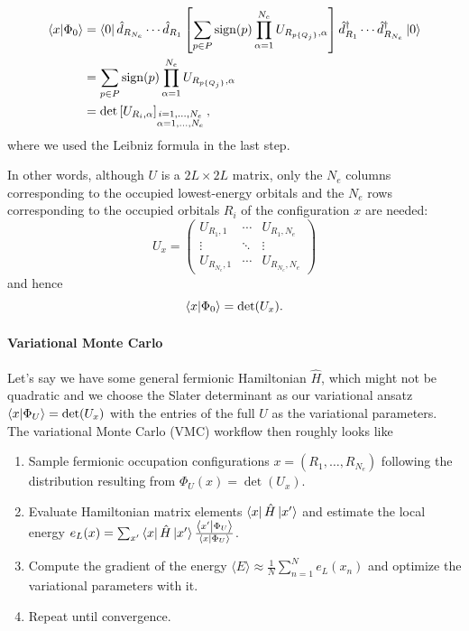 \documentclass[../../../main.tex]{subfiles}
\begin{document}
\begin{align}
    \left\langle x \middle| \Phi_0 \right\rangle
    &= \left\langle 0 \right\rvert \hat d_{R_{N_{e}}} \cdots \hat d_{R_1}
    \left[\sum_{p\in P}
    \operatorname{sign}(p)
    \prod_{\alpha=1}^{N_{e}}
    U_{R_{p\{Q_j\}},\alpha}\right] \hat d^\dagger_{R_1}
    \cdots
    \hat d^\dagger_{R_{N_{e}}} \left\lvert 0 \right\rangle \label{eq:determinant-describes-ground-state-entry-point-jwm} \\
    &= \sum_{p\in P}
    \operatorname{sign}(p)
    \prod_{\alpha=1}^{N_{e}}
    U_{R_{p\{Q_j\}},\alpha}  \\
    &= \det\left[
        U_{R_i,\alpha}
    \right]_{
        \substack{
            i=1,\ldots,N_{e}\\
            \alpha=1,\ldots,N_{e}
        }
    },
    \label{eq:slater-determinant-overlap}
\end{align}
where we used the Leibniz formula in the last step.

In other words, although $U$ is a $2L\times 2L$ matrix, only the
$N_{e}$ columns corresponding to the occupied lowest-energy
orbitals and the $N_{e}$ rows corresponding to the occupied
orbitals $R_i$ of the configuration $x$ are needed:
\begin{equation}
    U_x
    =
    \begin{pmatrix}
        U_{R_1,1}  & \cdots & U_{R_1,N_{e}} \\
        \vdots     & \ddots & \vdots \\
        U_{R_{N_{e}},1} & \cdots & U_{R_{N_{e}},N_{e}}
    \end{pmatrix}
\end{equation}
and hence
\begin{equation}
    \left\langle x \middle| \Phi_0 \right\rangle = \det(U_x).
\end{equation}

\paragraph{Variational Monte Carlo}
Let's say we have some general fermionic Hamiltonian $\hat H$, which might not be quadratic and we choose the Slater determinant as our variational ansatz $\left\langle x \middle| \Phi_U \right\rangle = \det(U_x)$ with the entries of the full $U$ as the variational parameters. The variational Monte Carlo (VMC) workflow then roughly looks like
\begin{enumerate}
    \item Sample fermionic occupation configurations $x = (R_1, \ldots, R_{N_e})$ following the distribution resulting from $\Phi_U(x) = \det(U_x)$.
    \item Evaluate Hamiltonian matrix elements $\left\langle x \right\rvert \hat H \left\lvert x' \right\rangle$ and estimate the local energy $e_L(x) = \sum_{x'} \left\langle x \right\rvert \hat H \left\lvert x' \right\rangle \frac{\left\langle x' \middle| \Phi_U \right\rangle}{\left\langle x \middle| \Phi_U \right\rangle}$.
    \item Compute the gradient of the energy $\langle E \rangle \approx \frac{1}{N} \sum_{n=1}^N e_L(x_n)$ and optimize the variational parameters with it.
    \item Repeat until convergence.
\end{enumerate}
\end{document}
